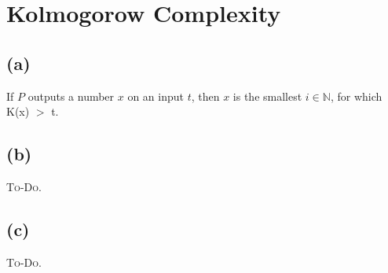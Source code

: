 

\setcounter{section}{3}


\section{Kolmogorow Complexity}

\subsection{(a)}

If $P$ outputs a number $x$ on an input $t$, then $x$ is the smallest $i \in \mathbb{N}$, for which K(x) $>$ t.

\subsection{(b)}

\textsc{To-Do.}

\subsection{(c)}

\textsc{To-Do.}


